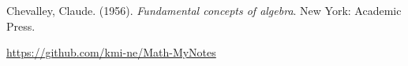 \documentclass[autodetect-engine, ja=standard, base=9pt, b5j, english]{bxjsreport}
\begin{document}
Chevalley, Claude. (1956). \textit{Fundamental concepts of algebra}. New York: Academic Press.

\url{https://github.com/kmi-ne/Math-MyNotes}


\end{document}
